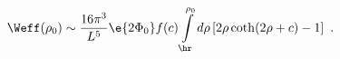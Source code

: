 \begin{equation}
\label{superpot}
  \Weff(\rho_0) \sim \frac{16 \pi^3}{L^5} \e{2\Phi_0} f(c)
  \int\limits_{\hr}^{\rho_0} d\rho \left[ 2\rho \coth(2\rho+c) -1
  \right]~.
\end{equation}

